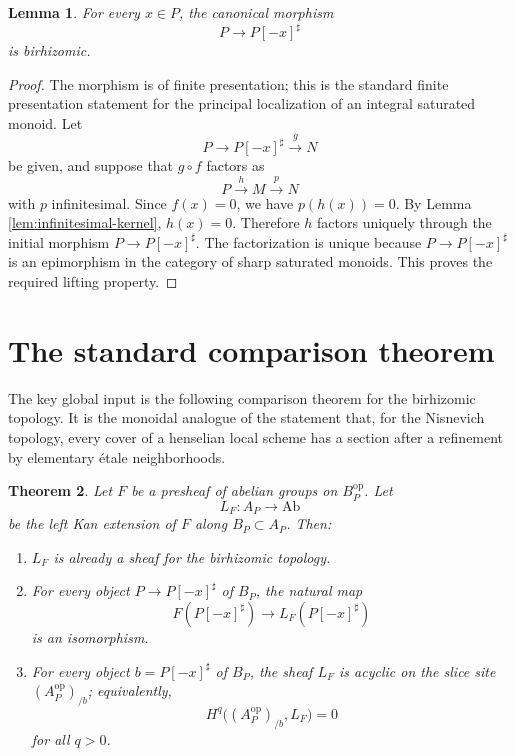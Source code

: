 \documentclass{article}
\newtheorem{theorem}{Theorem}[section]
\newtheorem{lemma}[theorem]{Lemma}
\theoremstyle{definition}
\begin{document}
\begin{lemma}\label{lem:localization-birhizomic}
For every \(x\in P\), the canonical morphism
\[
P\longrightarrow P[-x]^\sharp
\]
is birhizomic.
\end{lemma}

\begin{proof}
The morphism is of finite presentation; this is the standard finite presentation statement for the principal localization of an integral saturated monoid.  Let
\[
P\longrightarrow P[-x]^\sharp\xrightarrow{g}N
\]
be given, and suppose that \(g\circ f\) factors as
\[
P\xrightarrow{h}M\xrightarrow{p}N
\]
with \(p\) infinitesimal.  Since \(f(x)=0\), we have \(p(h(x))=0\).  By Lemma \ref{lem:infinitesimal-kernel}, \(h(x)=0\).  Therefore \(h\) factors uniquely through the initial morphism \(P\to P[-x]^\sharp\).  The factorization is unique because \(P\to P[-x]^\sharp\) is an epimorphism in the category of sharp saturated monoids.  This proves the required lifting property.
\end{proof}

\section{The standard comparison theorem}

The key global input is the following comparison theorem for the birhizomic topology.  It is the monoidal analogue of the statement that, for the Nisnevich topology, every cover of a henselian local scheme has a section after a refinement by elementary étale neighborhoods.

\begin{theorem}\label{thm:comparison}
Let \(F\) be a presheaf of abelian groups on \(B_P^{\mathrm{op}}\).  Let
\[
L_F:A_P\longrightarrow \mathrm{Ab}
\]
be the left Kan extension of \(F\) along \(B_P\subset A_P\).  Then:
\begin{enumerate}
\item \(L_F\) is already a sheaf for the birhizomic topology.
\item For every object \(P\to P[-x]^\sharp\) of \(B_P\), the natural map
\[
F(P[-x]^\sharp)\longrightarrow L_F(P[-x]^\sharp)
\]
is an isomorphism.
\item For every object \(b=P[-x]^\sharp\) of \(B_P\), the sheaf \(L_F\) is acyclic on the slice site \((A_P^{\mathrm{op}})_{/b}\); equivalently,
\[
H^q\bigl((A_P^{\mathrm{op}})_{/b},L_F\bigr)=0
\]
for all \(q>0\).
\end{enumerate}
\end{theorem}
\end{document}
